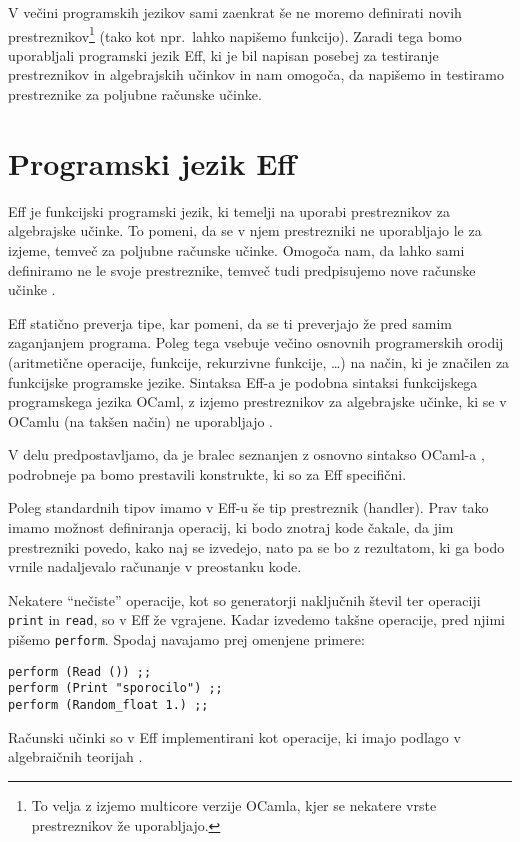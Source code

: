 \documentclass[a4paper,12pt]{article}
\theoremstyle{definition} %
\begin{document}
V večini programskih jezikov sami zaenkrat še ne moremo definirati novih prestreznikov\footnote{To velja z izjemo multicore verzije OCamla, kjer se nekatere vrste prestreznikov že uporabljajo.} (tako kot npr.\ lahko napišemo funkcijo). Zaradi tega bomo uporabljali programski jezik Eff, ki je bil napisan posebej za testiranje prestreznikov in algebrajskih učinkov in nam omogoča, da napišemo in testiramo prestreznike za poljubne računske učinke. 

\section{Programski jezik Eff}

Eff je funkcijski programski jezik, ki temelji na uporabi prestreznikov za algebrajske učinke. To pomeni, da se v njem prestrezniki ne uporabljajo le za izjeme, temveč za poljubne računske učinke. Omogoča nam, da lahko sami definiramo ne le svoje prestreznike, temveč tudi predpisujemo nove računske učinke \cite{programming}. 

Eff statično preverja tipe, kar pomeni, da se ti preverjajo že pred samim zaganjanjem programa. Poleg tega vsebuje večino osnovnih programerskih orodij (aritmetične operacije, funkcije, rekurzivne funkcije, \dots) na način, ki je značilen za funkcijske programske jezike. Sintaksa Eff-a je podobna sintaksi funkcijskega programskega jezika OCaml, z izjemo prestreznikov za algebrajske učinke, ki se v OCamlu (na takšen način) ne uporabljajo \cite{programming}.

V delu predpostavljamo, da je bralec seznanjen z osnovno sintakso OCaml-a \cite{OCaml}, podrobneje pa bomo prestavili konstrukte, ki so za Eff specifični.

Poleg standardnih tipov imamo v Eff-u še tip prestreznik (handler). Prav tako imamo možnost definiranja operacij, ki bodo znotraj kode čakale, da jim prestrezniki povedo, kako naj se izvedejo, nato pa se bo z rezultatom, ki ga bodo vrnile nadaljevalo računanje v preostanku kode. 

Nekatere "`nečiste"' operacije, kot so generatorji naključnih števil ter operaciji \lstinline{print} in \lstinline{read}, so v Eff že vgrajene. Kadar izvedemo  takšne operacije, pred njimi pišemo \lstinline{perform}. Spodaj navajamo prej omenjene primere:
\begin{lstlisting}
perform (Read ()) ;;
perform (Print "sporocilo") ;;
perform (Random_float 1.) ;;
\end{lstlisting}
Računski učinki so v Eff implementirani kot operacije, ki imajo podlago v algebraičnih teorijah \cite{introduction, programming}.
\end{document}
